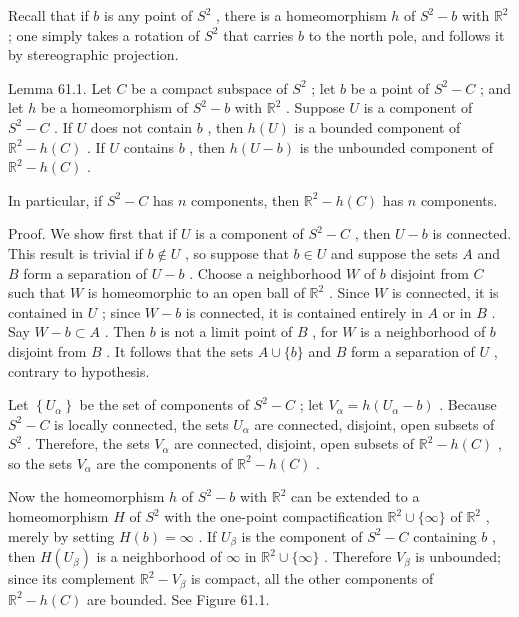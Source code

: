 \documentclass[10pt]{article}
\begin{document}
Recall that if \(b\) is any point of \({S}^{2}\) , there is a homeomorphism \(h\) of \({S}^{2} - b\) with \({\mathbb{R}}^{2}\) ; one simply takes a rotation of \({S}^{2}\) that carries \(b\) to the north pole, and follows it by stereographic projection.

Lemma 61.1. Let \(C\) be a compact subspace of \({S}^{2}\) ; let \(b\) be a point of \({S}^{2} - C\) ; and let \(h\) be a homeomorphism of \({S}^{2} - b\) with \({\mathbb{R}}^{2}\) . Suppose \(U\) is a component of \({S}^{2} - C\) . If \(U\) does not contain \(b\) , then \(h\left( U\right)\) is a bounded component of \({\mathbb{R}}^{2} - h\left( C\right)\) . If \(U\) contains \(b\) , then \(h\left( {U - b}\right)\) is the unbounded component of \({\mathbb{R}}^{2} - h\left( C\right)\) .

In particular, if \({S}^{2} - C\) has \(n\) components, then \({\mathbb{R}}^{2} - h\left( C\right)\) has \(n\) components.

Proof. We show first that if \(U\) is a component of \({S}^{2} - C\) , then \(U - b\) is connected. This result is trivial if \(b \notin  U\) , so suppose that \(b \in  U\) and suppose the sets \(A\) and \(B\) form a separation of \(U - b\) . Choose a neighborhood \(W\) of \(b\) disjoint from \(C\) such that \(W\) is homeomorphic to an open ball of \({\mathbb{R}}^{2}\) . Since \(W\) is connected, it is contained in \(U\) ; since \(W - b\) is connected, it is contained entirely in \(A\) or in \(B\) . Say \(W - b \subset  A\) . Then \(b\) is not a limit point of \(B\) , for \(W\) is a neighborhood of \(b\) disjoint from \(B\) . It follows that the sets \(A \cup  \{ b\}\) and \(B\) form a separation of \(U\) , contrary to hypothesis.

Let \(\left\{  {U}_{\alpha }\right\}\) be the set of components of \({S}^{2} - C\) ; let \({V}_{\alpha } = h\left( {{U}_{\alpha } - b}\right)\) . Because \({S}^{2} - C\) is locally connected, the sets \({U}_{\alpha }\) are connected, disjoint, open subsets of \({S}^{2}\) . Therefore, the sets \({V}_{\alpha }\) are connected, disjoint, open subsets of \({\mathbb{R}}^{2} - h\left( C\right)\) , so the sets \({V}_{\alpha }\) are the components of \({\mathbb{R}}^{2} - h\left( C\right)\) .

Now the homeomorphism \(h\) of \({S}^{2} - b\) with \({\mathbb{R}}^{2}\) can be extended to a homeomorphism \(H\) of \({S}^{2}\) with the one-point compactification \({\mathbb{R}}^{2} \cup  \{ \infty \}\) of \({\mathbb{R}}^{2}\) , merely by setting \(H\left( b\right)  = \infty\) . If \({U}_{\beta }\) is the component of \({S}^{2} - C\) containing \(b\) , then \(H\left( {U}_{\beta }\right)\) is a neighborhood of \(\infty\) in \({\mathbb{R}}^{2} \cup  \{ \infty \}\) . Therefore \({V}_{\beta }\) is unbounded; since its complement \({\mathbb{R}}^{2} - {V}_{\beta }\) is compact, all the other components of \({\mathbb{R}}^{2} - h\left( C\right)\) are bounded. See Figure 61.1.
\end{document}
